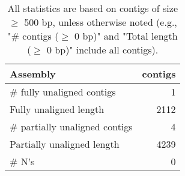 \documentclass[12pt,a4paper]{article}
\begin{document}
\begin{table}[ht]
\begin{center}
\caption{All statistics are based on contigs of size $\geq$ 500 bp, unless otherwise noted (e.g., "\# contigs ($\geq$ 0 bp)" and "Total length ($\geq$ 0 bp)" include all contigs).}
\begin{tabular}{|l*{1}{|r}|}
\hline
Assembly & contigs \\ \hline
\# fully unaligned contigs & 1 \\ \hline
Fully unaligned length & 2112 \\ \hline
\# partially unaligned contigs & 4 \\ \hline
Partially unaligned length & 4239 \\ \hline
\# N's & 0 \\ \hline
\end{tabular}
\end{center}
\end{table}
\end{document}
